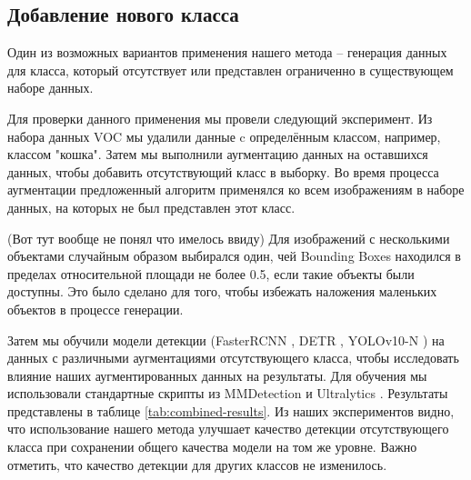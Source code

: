 \documentclass[11pt]{article}
\begin{document}
\subsection{Добавление нового класса}

% 
Один из возможных вариантов применения нашего метода -- генерация данных для класса, который отсутствует или представлен ограниченно в существующем наборе данных.

Для проверки данного применения мы провели следующий эксперимент. Из набора данных VOC мы удалили данные c определённым классом, например, классом "кошка". Затем мы выполнили аугментацию данных на оставшихся данных, чтобы добавить отсутствующий класс в выборку. Во время процесса аугментации предложенный алгоритм применялся ко всем изображениям в наборе данных, на которых не был представлен этот класс.


(Вот тут вообще не понял что имелось ввиду)
Для изображений с несколькими объектами случайным образом выбирался один, чей Bounding Boxes находился в пределах относительной площади не более 0.5, если такие объекты были доступны. Это было сделано для того, чтобы избежать наложения маленьких объектов в процессе генерации.

Затем мы обучили модели детекции (FasterRCNN \cite{ren2015faster}, DETR \cite{carion2020end}, YOLOv10-N \cite{jocher2023yolo}) на данных с различными аугментациями отсутствующего класса, чтобы исследовать влияние наших аугментированных данных на результаты. Для обучения мы использовали стандартные скрипты из MMDetection \cite{chen2019mmdetection} и Ultralytics \cite{jocher2023yolo}. Результаты представлены в таблице \ref{tab:combined-results}. Из наших экспериментов видно, что использование нашего метода улучшает качество детекции отсутствующего класса при сохранении общего качества модели на том же уровне. Важно отметить, что качество детекции для других классов не изменилось.

\end{document}
